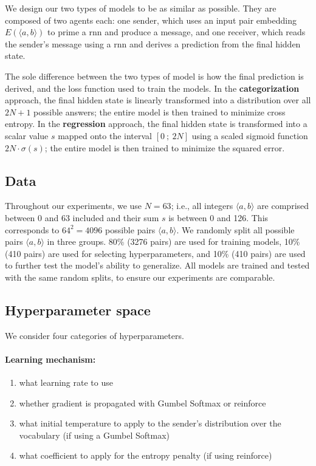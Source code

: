 \documentclass[twocolumn]{article}
\begin{document}
We design our two types of models to be as similar as possible. 
They are composed of two agents each: one sender, which uses an input pair embedding $E(\langle a,b \rangle)$ to prime a {\sc rnn} and produce a message, and one receiver, which reads the sender's message using a {\sc rnn} and derives a prediction from the final hidden state.

The sole difference between the two types of model is how the final prediction is derived, and the loss function used to train the models.
In the \textbf{categorization} approach, the final hidden state is linearly transformed into a distribution over all $2N + 1$ possible answers; the entire model is then trained to minimize cross entropy.
In the \textbf{regression} approach, the final hidden state is transformed into a scalar value $s$ mapped onto the interval $\left[0~; ~2N \right]$ using a scaled sigmoid function $2N\cdot\sigma(s)$; the entire model is then trained to minimize the squared error. 

\subsection{Data} \label{sec:experiment:data}

Throughout our experiments, we use $N=63$; i.e., all integers $\langle a,b \rangle$ are comprised between 0 and 63 included and their sum $s$ is between 0 and 126. 
This corresponds to $64^2=4096$ possible pairs $\langle a,b \rangle$.
We randomly split all possible pairs $\langle a,b \rangle$ in three groups. 80\% (3276 pairs) are used for training models, 10\% (410 pairs) are used for selecting hyperparameters, and 10\% (410 pairs) are used to further test the model's ability to generalize.
All models are trained and tested with the same random splits, to ensure our experiments are comparable.

\subsection{Hyperparameter space} \label{sec:experiment:hparams}

We consider four categories of hyperparameters.

\vspace*{-0.5em}
\paragraph{Learning mechanism:} 
\begin{enumerate}[label=(\roman*)]
    \vspace*{-0.5em}
    \itemsep-0.25em 
    \item what learning rate to use
    \item \label{it:hp:mechanism} whether gradient is propagated with Gumbel Softmax or {\sc reinforce}
    \item \label{it:hp:temp} what initial temperature to apply to the sender's distribution over the vocabulary (if using a Gumbel Softmax)
    \item \label{it:hp:entropy} what coefficient to apply for the entropy penalty (if using {\sc reinforce})
\end{enumerate}
\end{document}

